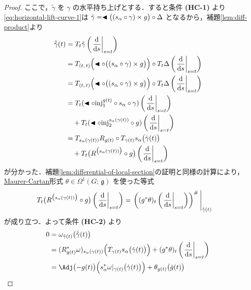 \documentclass[geometry_main]{subfiles}
\begin{document}
\begin{proof}
    ここで，$\tilde{\gamma}$ を $\gamma$ の水平持ち上げとする．すると条件 \textsf{\textbf{(HC-1)}} より\eqref{eq:horizontal-lift-curve-1}は $\tilde{\gamma} =  \blacktriangleleft \bigl( (s_\alpha \circ \gamma) \times g \bigr) \circ \Delta$ となるから，補題\ref{lem:diff-product}より
    \begin{align}
        \dot{\tilde{\gamma}}(t) 
        &= T_t \tilde{\gamma} \left( \eval{\dv{}{s}}_{s=t} \right) \\
        &= T_{(t,\, t)}\Bigl(\btl \circ \bigl( (s_\alpha \circ \gamma) \times g \bigr) \Bigr)\circ T_t \Delta \left( \eval{\dv{}{s}}_{s=t} \right) \\
        &= T_{(t,\, t)}\Bigl(\btl \circ \bigl( (s_\alpha \circ \gamma) \times g \bigr) \Bigr)\circ T_t \Delta \left( \eval{\dv{}{s}}_{s=t} \right) \\
        &= T_{t}(\btl \circ \mathrm{inj}_1^{g(t)} \circ s_\alpha \circ \gamma) \left( \eval{\dv{}{s}}_{s=t} \right) \\
        &\quad + T_{t}(\btl \circ \mathrm{inj}_2^{s_\alpha (\gamma(t))} \circ g) \left( \eval{\dv{}{s}}_{s=t} \right) \\
        &= T_{s_\alpha(\gamma(t))} R_{g(t)} \circ T_{\gamma(t)}s_\alpha \bigl(\dot{\gamma}(t)\bigr) \\
        &\quad + T_{t} \bigl(R^{\bigl( s_\alpha(\gamma(t)) \bigr)} \circ g\bigr) \left( \eval{\dv{}{s}}_{s=t} \right) \label{eq:horizontal-lift-curve-4}
    \end{align}
    が分かった．補題\ref{lem:differential-of-local-section}の証明と同様の計算により，\hyperref[def:Maurer-Cartan]{Maurer-Cartan}形式 $\theta \in \Omega^1(G;\, \mathfrak{g})$ を使った等式
    \begin{align}
        T_{t} \bigl(R^{\bigl( s_\alpha(\gamma(t)) \bigr)} \circ g\bigr) \left( \eval{\dv{}{s}}_{s=t} \right) 
        &= \eval{\left( (g^* \theta)_t \left( \eval{\dv{}{s}}_{s=t} \right) \right)^\#}_{\tilde{\gamma}(t)}
    \end{align}
    が成り立つ．よって条件 \textsf{\textbf{(HC-2)}} より
    \begin{align}
        0 
        &= \omega_{\tilde{\gamma}(t)} \bigl( \dot{\tilde{\gamma}} (t) \bigr) \\
        &= (R_{g(t)}^* \omega)_{s_\alpha(\gamma(t))} \Bigl( T_{\gamma(t)}s_\alpha \bigl(\dot{\gamma}(t)\bigr) \Bigr) + (g^* \theta)_t \left( \eval{\dv{}{s}}_{s=t} \right) \\
        &= \Adj \bigl( -g(t) \bigr) \Bigl( s_\alpha^* \omega|_{\gamma(t)}\bigl(\dot{\gamma}(t)\bigr) \Bigr) + \theta_{g(t)} \bigl( \dot{g}(t) \bigr) \label{eq:horizontal-lift-curve-2}

\end{align}
\end{proof}
\end{document}
